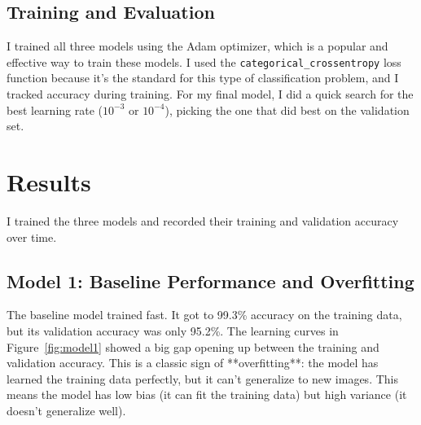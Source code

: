 \documentclass[pdflatex,sn-mathphys-num]{sn-jnl}%
\theoremstyle{thmstyleone}%
\theoremstyle{thmstyletwo}%
\theoremstyle{thmstylethree}%
\begin{document}
\subsection{Training and Evaluation}
I trained all three models using the Adam optimizer, which is a popular and effective way to train these models. I used the \texttt{categorical\_crossentropy} loss function because it's the standard for this type of classification problem, and I tracked accuracy during training. For my final model, I did a quick search for the best learning rate ($10^{-3}$ or $10^{-4}$), picking the one that did best on the validation set.

\section{Results}\label{sec2}

I trained the three models and recorded their training and validation accuracy over time.

\subsection{Model 1: Baseline Performance and Overfitting}
The baseline model trained fast. It got to 99.3\% accuracy on the training data, but its validation accuracy was only 95.2\%. The learning curves in Figure~\ref{fig:model1} showed a big gap opening up between the training and validation accuracy. This is a classic sign of **overfitting**: the model has learned the training data perfectly, but it can't generalize to new images. This means the model has low bias (it can fit the training data) but high variance (it doesn't generalize well).
\end{document}
